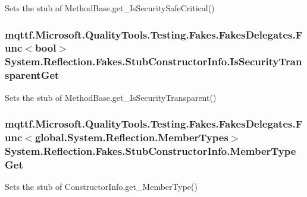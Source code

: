 Sets the stub of Method\-Base.\-get\-\_\-\-Is\-Security\-Safe\-Critical()

\hypertarget{class_system_1_1_reflection_1_1_fakes_1_1_stub_constructor_info_a6c824af40752c6bd59f9fbda7d65b9b1}{
\subsubsection[{Is\-Security\-Transparent\-Get}]{\setlength{\rightskip}{0pt plus 5cm}mqttf.\-Microsoft.\-Quality\-Tools.\-Testing.\-Fakes.\-Fakes\-Delegates.\-Func$<$bool$>$ System.\-Reflection.\-Fakes.\-Stub\-Constructor\-Info.\-Is\-Security\-Transparent\-Get}}\label{class_system_1_1_reflection_1_1_fakes_1_1_stub_constructor_info_a6c824af40752c6bd59f9fbda7d65b9b1}


Sets the stub of Method\-Base.\-get\-\_\-\-Is\-Security\-Transparent()

\hypertarget{class_system_1_1_reflection_1_1_fakes_1_1_stub_constructor_info_a13b1c48ac3ca697c1ad8ce6bd31a6888}{
\subsubsection[{Member\-Type\-Get}]{\setlength{\rightskip}{0pt plus 5cm}mqttf.\-Microsoft.\-Quality\-Tools.\-Testing.\-Fakes.\-Fakes\-Delegates.\-Func$<$global.\-System.\-Reflection.\-Member\-Types$>$ System.\-Reflection.\-Fakes.\-Stub\-Constructor\-Info.\-Member\-Type\-Get}}\label{class_system_1_1_reflection_1_1_fakes_1_1_stub_constructor_info_a13b1c48ac3ca697c1ad8ce6bd31a6888}


Sets the stub of Constructor\-Info.\-get\-\_\-\-Member\-Type()

